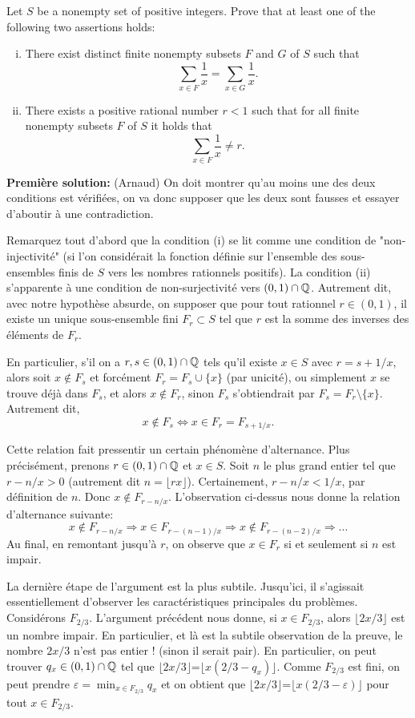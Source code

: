Let $S$ be a nonempty set of positive integers. Prove that at least one of the following two assertions holds:
\begin{enumerate}[(i)]
    \item There exist distinct finite nonempty subsets $F$ and $G$ of $S$ such that 
    \[\sum_{x\in F}\frac{1}{x}=\sum_{x\in G}\frac{1}{x}.\]
    \item There exists a positive rational number $r<1$ such that for all finite nonempty subsets $F$ of $S$ it holds that
    \[\sum_{x\in F} \frac{1}{x}\neq r.\]
\end{enumerate}

\textbf{Première solution:} (Arnaud) On doit montrer qu'au moins une des deux conditions est vérifiées, on va donc supposer que les deux sont fausses et essayer d'aboutir à une contradiction. 

Remarquez tout d'abord que la condition (i) se lit comme une condition de "non-injectivité" (si l'on considérait la fonction définie sur l'ensemble des sous-ensembles finis de $S$ vers les nombres rationnels positifs). La condition (ii) s'apparente à une condition de non-surjectivité vers $(0,1)\cap \mathbb{Q}$. Autrement dit, avec notre hypothèse absurde, on supposer que pour tout rationnel $r\in (0,1)$, il existe un unique sous-ensemble fini $F_r\subset S$ tel que $r$ est la somme des inverses des éléments de $F_r$.

En particulier, s'il on a $r,s\in (0,1)\cap \mathbb{Q}$ tels qu'il existe $x\in S$ avec $r=s+1/x$, alors soit $x\notin F_s$ et forcément $F_r=F_s\cup\{x\}$ (par unicité), ou simplement $x$ se trouve déjà dans $F_s$, et alors $x\notin F_r$, sinon $F_s$ s'obtiendrait par $F_s=F_r\setminus \{x\}$. Autrement dit,
\[
x\notin F_s \Leftrightarrow x\in F_r=F_{s+1/x}.
\]

Cette relation fait pressentir un certain phénomène d'alternance. Plus précisément, prenons $r\in (0,1)\cap\mathbb{Q}$ et $x\in S$. Soit $n$ le plus grand entier tel que $r-n/x>0$ (autrement dit $n=\lfloor rx\rfloor$). Certainement, $r-n/x<1/x$, par définition de $n$. Donc $x\notin F_{r-n/x}$. L'observation ci-dessus nous donne la relation d'alternance suivante:
\[
x\notin F_{r-n/x}\Rightarrow x\in F_{r-(n-1)/x} \Rightarrow x\notin F_{r-(n-2)/x}\Rightarrow \ldots
\]
Au final, en remontant jusqu'à $r$, on observe que $x\in F_r$ si et seulement si $n$ est impair.

La dernière étape de l'argument est la plus subtile. Jusqu'ici, il s'agissait essentiellement d'observer les caractéristiques principales du problèmes. Considérons $F_{2/3}$. L'argument précédent nous donne, si $x\in F_{2/3}$, alors $\lfloor 2x/3\rfloor$ est un nombre impair. En particulier, et là est la subtile observation de la preuve, le nombre $2x/3$ n'est pas entier ! (sinon il serait pair). En particulier, on peut trouver $q_x\in (0,1)\cap\mathbb{Q}$ tel que $\lfloor 2x/3\rfloor$=$\lfloor x(2/3-q_x)\rfloor$. Comme $F_{2/3}$ est fini, on peut prendre $\varepsilon =\min_{x\in F_{2/3}}q_x$ et on obtient que $\lfloor 2x/3\rfloor$=$\lfloor x(2/3-\varepsilon)\rfloor$ pour tout $x\in F_{2/3}$. 


